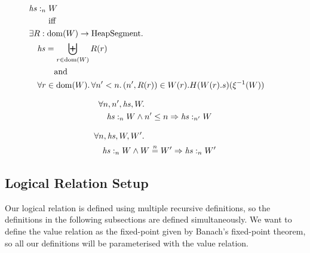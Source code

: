 \documentclass[a4paper]{article}
\newcommand{\nequal}[1][n]{\stackrel{\tiny{#1}}{=}}
\DeclareMathOperator{\dom}{dom}
\newcommand{\var}[1]{\mathit{#1}}
\newcommand{\hs}{\var{hs}}
\newcommand{\heap}{\var{heap}}
\newcommand{\heapSat}[3][\heap]{#1 :_{#2} #3}
\newcommand{\plaindom}[1]{\mathrm{#1}}
\newcommand{\HeapSegments}{\plaindom{HeapSegment}}
\newcommand{\npair}[2][n]{\left(#1,#2 \right)}
\begin{document}
\begin{definition}
\begin{align*}
&\heapSat[\hs]{n}{W} \\
&\qquad\text{ iff }\\
&\exists R : \dom(W) \rightarrow \HeapSegments \ldotp & &\\
&\quad\begin{aligned}
  &\hs = \biguplus_{r \in \dom(W)} R(r) \\
  &\qquad\text{and}\\
  &\forall r \in \dom(W) \ldotp \forall n' < n \ldotp \npair[n']{R(r)} \in W(r).H(W(r).s)(\xi^{-1}(W))
\end{aligned} 
\end{align*}
\end{definition}

\begin{lemma}
\label{lem:heapsat-dc}
  \begin{align*}
    & \forall n,n',\hs, W \ldotp\\
    & \quad \heapSat[\hs]{n}{W} \land n' \leq n \Rightarrow \heapSat[\hs]{n'}{W}
  \end{align*}
\end{lemma}

\begin{lemma}
\label{lem:heapsat-ne}
  \begin{align*}
    & \forall n,\hs, W, W' \ldotp\\
    & \quad \heapSat[\hs]{n}{W} \land W \nequal W' \Rightarrow \heapSat[\hs]{n}{W'}
  \end{align*}
\end{lemma}

\subsection{Logical Relation Setup}
\label{subsec:logical-relation-setup}
Our logical relation is defined using multiple recursive definitions, so the definitions in the following subsections are defined simultaneously. We want to define the value relation as the fixed-point given by Banach's fixed-point theorem, so all our definitions will be parameterised with the value relation.
\end{document}
